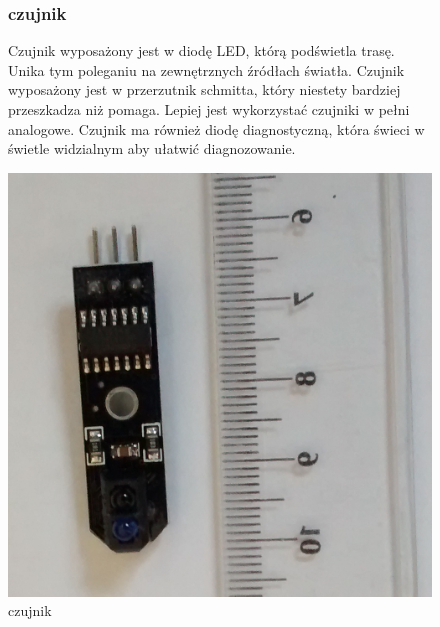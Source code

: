 \documentclass[a4paper,11pt]{article}
\def\SCALE{0.6}
\begin{document}
\begin{figure}[H]
	\subsubsection{czujnik}
	Czujnik wyposażony jest w diodę LED, którą podświetla trasę. Unika tym poleganiu na zewnętrznych źródłach światła. Czujnik wyposażony jest w przerzutnik schmitta, który niestety bardziej przeszkadza niż pomaga. Lepiej jest wykorzystać czujniki w pełni analogowe. Czujnik ma również diodę diagnostyczną, która świeci w świetle widzialnym aby ułatwić diagnozowanie.
	
	\centering
	\includegraphics[width=\SCALE
	\paperwidth]{czujnik}
	\caption{czujnik}

\end{figure}
\end{document}
